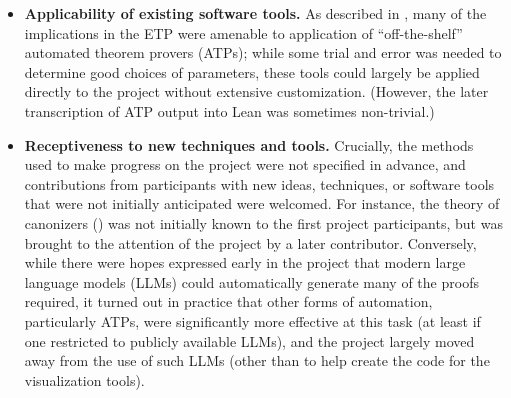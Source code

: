 \documentclass[12pt]{amsart}
\theoremstyle{definition}
\begin{document}
\begin{itemize}
\item \textbf{Applicability of existing software tools.}  As described in , many of the implications in the ETP were amenable to application of ``off-the-shelf'' automated theorem provers (ATPs); while some trial and error was needed to determine good choices of parameters, these tools could largely be applied directly to the project without extensive customization.  (However, the later transcription of ATP output into Lean was sometimes non-trivial.)
\item \textbf{Receptiveness to new techniques and tools.}  Crucially, the methods used to make progress on the project were not specified in advance, and contributions from participants with new ideas, techniques, or software tools that were not initially anticipated were welcomed.  For instance, the theory of canonizers () was not initially known to the first project participants, but was brought to the attention of the project by a later contributor.  Conversely, while there were hopes expressed early in the project that modern large language models (LLMs) could automatically generate many of the proofs required, it turned out in practice that other forms of automation, particularly ATPs, were significantly more effective at this task (at least if one restricted to publicly available LLMs), and the project largely moved away from the use of such LLMs (other than to help create the code for the visualization tools).
\end{itemize}
\end{document}
